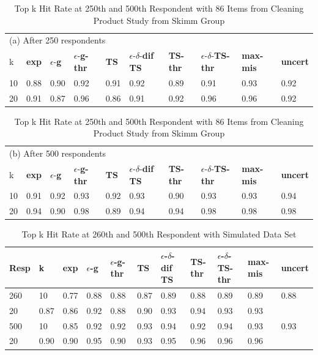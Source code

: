 \documentclass[nonblindrev]{informs3}
\newcommand{\fixedexpressS}{\textbf{exp}}
\newcommand{\egreedyS}{$\epsilon$-\textbf{g}}
\newcommand{\egreedythresS}{$\epsilon$-\textbf{g-thr}}
\newcommand{\misminS}{\textbf{max-mis}}
\newcommand{\tsS}{\textbf{TS} }
\newcommand{\edtsS}{$\epsilon$-$\delta$-\textbf{dif TS} }
\newcommand{\tsthresS}{\textbf{TS-thr} }
\newcommand{\edtsthresS}{$\epsilon$-$\delta$-\textbf{TS-thr} }
\newcommand{\uncertS}{\textbf{uncert} }
\begin{document}
\begin{table}
\caption{Top k Hit Rate at 250th and 500th Respondent with 86 Items from Cleaning Product Study from Skimm Group}
\label{table:skim}
\begin{center}
\begin{tabular}{llllllllll}
\hline 
\hline
\multicolumn{10}{l}{(a) After 250 respondents}\\
k &  \fixedexpressS&\egreedyS&\egreedythresS&\tsS&\edtsS&\tsthresS&\edtsthresS& \misminS& \uncertS \\ \hline
  10 &  0.88 &   0.90 & 0.92 &   0.91 & 0.92 & 0.89 & 0.91 &    0.93 &   0.92 \\
  20 & 0.91 & 0.87 &  0.96 & 0.86 & 0.91 & 0.92 & 0.96 &  0.96 &   0.92 \\  
\hline
\hline
\end{tabular}
\begin{tabular}{llllllllll}
\multicolumn{10}{l}{(b) After 500 respondents}\\
k &  \fixedexpressS&\egreedyS&\egreedythresS&\tsS&\edtsS&\tsthresS&\edtsthresS& \misminS& \uncertS  \\
\hline
  10 &  0.91 &   0.92 &  0.93 &   0.92 & 0.93 & 0.90 & 0.93 &    0.93 &   0.94 \\  
  20 &  0.94 &   0.90 & 0.98 &  0.89 & 0.94 & 0.94 & 0.98 &  0.98 &   0.98 \\ 
\hline 
\hline
\end{tabular}
\end{center}
\end{table}


\begin{table}
\caption{Top k Hit Rate at 260th and 500th Respondent with Simulated Data Set}\label{table:sim}
\begin{center}
\begin{tabular}{lllllllllll}
\hline  Resp &  k &  \fixedexpressS & \egreedyS&\egreedythresS&\tsS&\edtsS&\tsthresS&\edtsthresS& \misminS& \uncertS \\ \hline
260 &  10 & 0.77 &   0.88 & 0.88  & 0.87&0.89 & 	0.88&0.89 & 0.89 &  0.88 \\  20 &  0.87 &  0.86 &   0.92  & 0.88&0.90 &  	0.93&0.94&  0.93 &  0.93 \\  
500 & 10 & 0.85&0.92&0.92 & 0.93&0.94 & 0.92&0.94&0.93 &   0.93 \\  20 & 0.90&0.90&0.95& 0.90 &0.93 & 0.95&0.96 &0.96& 0.96 \\
\hline
\end{tabular}
\end{center}
\end{table}
\end{document}

